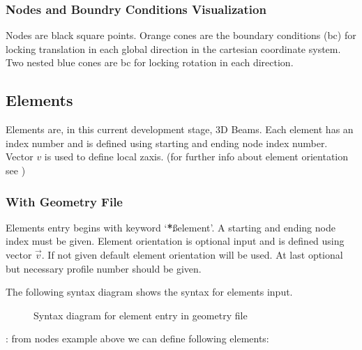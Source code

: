 \documentclass[letterpaper,10pt,english]{sphinxmanual}
\begin{document}
\noindent{}


\subsubsection{Nodes and Boundry Conditions Visualization}
\label{\detokenize{making_a_model:nodes-and-boundry-conditions-visualization}}
Nodes are black square points. Orange cones are the boundary conditions (bc) for locking translation in each global direction
in the cartesian coordinate system. Two nested blue cones are bc for locking rotation in each direction.

\noindent{}


\subsection{Elements}
\label{\detokenize{making_a_model:elements}}
Elements are, in this current development stage, 3D Beams. Each element has an index number and is defined using starting
and ending node index number. Vector \(v\) is used to define local z\sphinxhyphen{}axis. (for further info about element
orientation see {\hyperref[\detokenize{theory::doc}]{}})


\subsubsection{With Geometry File}
\label{\detokenize{making_a_model:id3}}
Elements entry begins with keyword ‘{\color{red}\bfseries{}*}ßelement’. A starting and ending node index must be given.
Element orientation is optional input and is defined using vector \(\vec{v}\).
If not given default element orientation will be used.
At last optional but necessary profile number should be given.

The following syntax diagram shows the syntax for elements input.

\begin{figure}[htbp]
\centering
\capstart

\noindent{}
\caption{Syntax diagram for element entry in geometry file}\label{\detokenize{making_a_model:id19}}\end{figure}

:
from nodes example above we can define following elements:

\begin{sphinxVerbatim}[commandchars=\\\{\}]
\end{sphinxVerbatim}
\end{document}
